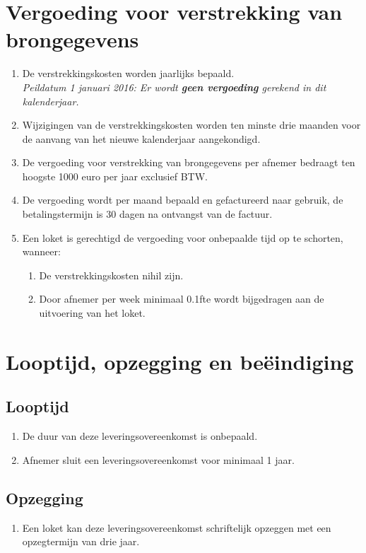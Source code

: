 \documentclass[10pt, a4paper]{article}
\begin{document}
\section{Vergoeding voor verstrekking van brongegevens}
\begin{enumerate}
   \item De verstrekkingskosten worden jaarlijks bepaald.\\ \textit{Peildatum 1 januari 2016: Er wordt \textbf{geen vergoeding} gerekend in dit kalenderjaar.}
   \item Wijzigingen van de verstrekkingskosten worden ten minste drie maanden voor de aanvang van het nieuwe kalenderjaar aangekondigd.
   \item De vergoeding voor verstrekking van brongegevens per afnemer bedraagt ten hoogste 1000 euro per jaar exclusief BTW.
   \item De vergoeding wordt per maand bepaald en gefactureerd naar gebruik, de betalingstermijn is 30 dagen na ontvangst van de factuur.
   \item Een loket is gerechtigd de vergoeding voor onbepaalde tijd op te schorten, wanneer:
   \begin{enumerate}
        \item De verstrekkingskosten nihil zijn.
        \item Door afnemer per week minimaal 0.1fte wordt bijgedragen aan de uitvoering van het loket.
   \end{enumerate}
\end{enumerate}

\section{Looptijd, opzegging en beëindiging}
\subsection*{Looptijd}
\begin{enumerate}
   \item De duur van deze leveringsovereenkomst is onbepaald.
   \item Afnemer sluit een leveringsovereenkomst voor minimaal 1 jaar.
\end{enumerate}

\subsection*{Opzegging}
\begin{enumerate}
   \item Een loket kan deze leveringsovereenkomst schriftelijk opzeggen met een opzegtermijn van drie jaar.
\end{enumerate}
\end{document}
